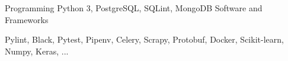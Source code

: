 \begin{cventries}
  \cventry
    {Programming}
    {}
    {}
    {}
    {Python 3, PostgreSQL, SQLint, MongoDB}
  \cventry
    {Software and Frameworks}
    {}
    {}
    {}
    {
     \begin{cvitems}
       \item {Pylint, Black, Pytest, Pipenv, Celery, Scrapy, Protobuf, Docker, Scikit-learn, Numpy, Keras, ...}
     \end{cvitems}
    }

\end{cventries}
